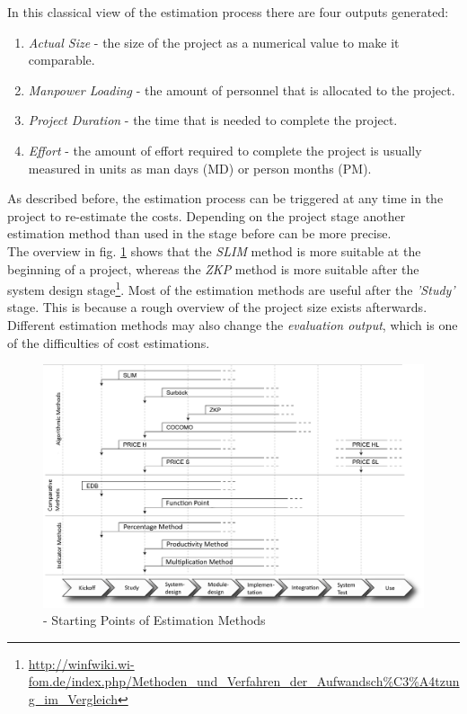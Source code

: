 In this classical view of the estimation process there are four outputs generated:
\begin{enumerate}
	\item \textit{Actual Size} - the size of the project as a numerical value to make it comparable.
	\item \textit{Manpower Loading} - the amount of personnel that is allocated to the project.
	\item \textit{Project Duration} - the time that is needed to complete the project.
	\item \textit{Effort} - the amount of effort required to complete the project is usually measured in units as man days (MD) or person months (PM).
\end{enumerate}
As described before, the estimation process can be triggered at any time in the project to re-estimate the costs. Depending on the project stage another estimation method than used in the stage before can be more precise.\\
The overview in fig. \ref{fig:estimationMethodInStage} shows that the \textit{SLIM} method is more suitable at the beginning of a project, whereas the \textit{ZKP} method is more suitable after the system design stage\footnote{\url{http://winfwiki.wi-fom.de/index.php/Methoden_und_Verfahren_der_Aufwandsch\%C3\%A4tzung_im_Vergleich}}. Most of the estimation methods are useful after the \textit{'Study'} stage. This is because a rough overview of the project size exists afterwards. Different estimation methods may also change the \textit{evaluation output}, which is one of the difficulties of cost estimations.\\
\begin{figure}[h] 
	\centering 
	\includegraphics[width=13cm]{images/Einsatzzeitpunkte2.PNG} 
	\caption{- Starting Points of Estimation Methods} 
	\label{fig:estimationMethodInStage}
\end{figure}

